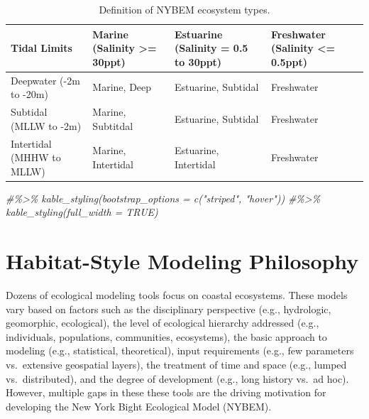 \documentclass[
]{book}
\newenvironment{Shaded}{\begin{snugshade}}{\end{snugshade}}
\newcommand{\CommentTok}[1]{\textcolor[rgb]{0.56,0.35,0.01}{\textit{#1}}}
\begin{document}
\begin{table}

\caption{\label{tab:unnamed-chunk-4}Definition of NYBEM ecosystem types.}
\centering
\begin{tabular}[t]{l|l|l|l}
\hline
Tidal Limits & Marine (Salinity >= 30ppt) & Estuarine (Salinity = 0.5 to 30ppt) & Freshwater (Salinity <= 0.5ppt)\\
\hline
Deepwater (-2m to -20m) & Marine, Deep & Estuarine, Subtidal & Freshwater\\
\hline
Subtidal (MLLW to -2m) & Marine, Subtitdal & Estuarine, Subtidal & Freshwater\\
\hline
Intertidal (MHHW to MLLW) & Marine, Intertidal & Estuarine, Intertidal & Freshwater\\
\hline
\end{tabular}
\end{table}

\begin{Shaded}
\begin{Highlighting}[]
\CommentTok{\#\%\textgreater{}\% kable\_styling(bootstrap\_options = c("striped", "hover")) }
\CommentTok{\#\%\textgreater{}\% kable\_styling(full\_width = TRUE)}
\end{Highlighting}
\end{Shaded}

\hypertarget{habitat-style-modeling-philosophy}{%
\section{Habitat-Style Modeling Philosophy}\label{habitat-style-modeling-philosophy}}

Dozens of ecological modeling tools focus on coastal ecosystems. These models vary based on factors such as the disciplinary perspective (e.g., hydrologic, geomorphic, ecological), the level of ecological hierarchy addressed (e.g., individuals, populations, communities, ecosystems), the basic approach to modeling (e.g., statistical, theoretical), input requirements (e.g., few parameters vs.~extensive geospatial layers), the treatment of time and space (e.g., lumped vs.~distributed), and the degree of development (e.g., long history vs.~ad hoc). However, multiple gaps in these these tools are the driving motivation for developing the New York Bight Ecological Model (NYBEM).
\end{document}
